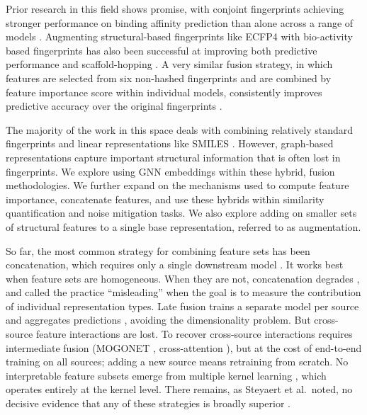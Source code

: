 Prior research in this field shows promise, with conjoint fingerprints achieving stronger performance on binding affinity prediction than alone across a range of models \citep{Xie2020}. Augmenting structural-based fingerprints like ECFP4 with bio-activity based fingerprints has also been successful at improving both predictive performance and scaffold-hopping \citep{Laufktter2019}. A very similar fusion strategy, in which features are selected from six non-hashed fingerprints and are combined by feature importance score within individual models, consistently improves predictive accuracy over the original fingerprints \citep{Turkina2025}. 

The majority of the work in this space deals with combining relatively standard fingerprints and linear representations like SMILES \citep{Xie2020, Laufktter2019}. However, graph-based representations capture important structural information that is often lost in fingerprints. We explore using GNN embeddings within these hybrid, fusion methodologies. We further expand on the mechanisms used to compute feature importance, concatenate features, and use these hybrids within similarity quantification and noise mitigation tasks. We also explore adding on smaller sets of structural features to a single base representation, referred to as augmentation. 

So far, the most common strategy for combining feature sets has been concatenation, which requires only a single downstream model \citep{Stahlschmidt2022}. It works best when feature sets are homogeneous. When they are not, concatenation degrades \citep{Stahlschmidt2022}, and \cite{Deng2023} called the practice ``misleading'' when the goal is to measure the contribution of individual representation types. Late fusion trains a separate model per source and aggregates predictions \citep{Steyaert2023}, avoiding the dimensionality problem. But cross-source feature interactions are lost. To recover cross-source interactions requires intermediate fusion (MOGONET \citep{Wang2021}, cross-attention \citep{Zhang2024}), but at the cost of end-to-end training on all sources; adding a new source means retraining from scratch. No interpretable feature subsets emerge from multiple kernel learning \citep{Gonen2011}, which operates entirely at the kernel level. There remains, as Steyaert et al.\ noted, no decisive evidence that any of these strategies is broadly superior \citep{Steyaert2023}.

